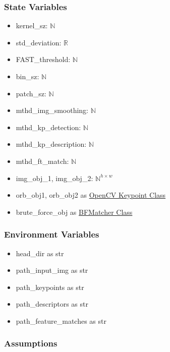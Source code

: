 \documentclass[12pt, titlepage]{article}
\begin{document}
\subsubsection{State Variables}
\begin{itemize}
  \item kernel\_sz: $\mathbb{N}$
  \item std\_deviation: $\mathbb{R}$
  \item FAST\_threshold: $\mathbb{N}$
  \item bin\_sz: $\mathbb{N}$
  \item patch\_sz: $\mathbb{N}$
  \item mthd\_img\_smoothing: $\mathbb{N}$
  \item mthd\_kp\_detection: $\mathbb{N}$
  \item mthd\_kp\_description: $\mathbb{N}$
  \item mthd\_ft\_match: $\mathbb{N}$
  \item img\_obj\_1, img\_obj\_2: $\mathbb{N}^{h \times w}$ 
  \item orb\_obj1, orb\_obj2 as \href{https://docs.opencv.org/3.4/d2/d29/classcv_1_1KeyPoint.html}
  {OpenCV Keypoint Class}
  \item brute\_force\_obj as \href{https://docs.opencv.org/3.4/d3/da1/classcv_1_1BFMatcher.html}{BFMatcher Class}
\end{itemize}



\subsubsection{Environment Variables}
\begin{itemize}
  \item head\_dir as str
  \item path\_input\_img as str 
  \item path\_keypoints as str
  \item path\_descriptors as str
  \item path\_feature\_matches as str
\end{itemize}


\subsubsection{Assumptions}

\end{document}

